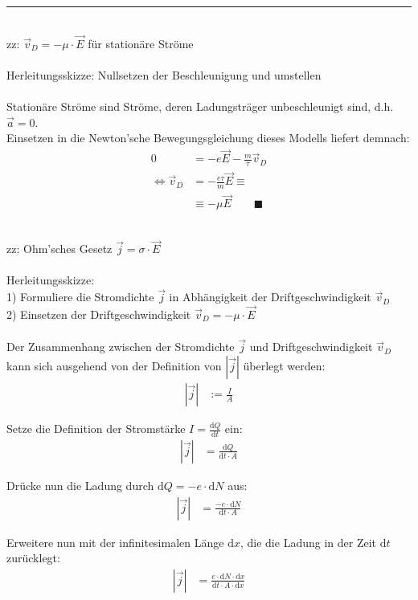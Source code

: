 \documentclass{article}
\newcommand{\diff}{\mathrm{d}}
\begin{document}
{\color{violet}
\hrule
	\\
	zz: $\vec{v}_D = -\mu \cdot \vec{E}$ für stationäre Ströme \\
	\\
	Herleitungsskizze: Nullsetzen der Beschleunigung und umstellen\\
	\\
	Stationäre Ströme sind Ströme, deren Ladungsträger unbeschleunigt sind, d.h. $\vec{a} = 0$.\\
	Einsetzen in die Newton'sche Bewegungsgleichung dieses Modells liefert demnach:
		\begin{align*}
			0 &= -e \vec{E} - \frac{m}{\tau} \vec{v}_D \\
			\Leftrightarrow \vec{v}_D &= -\frac{e\tau}{m} \vec{E} \equiv \\
			&\equiv -\mu \vec{E} \qquad \blacksquare
		\end{align*}
	

	\\
	zz: Ohm'sches Gesetz $\vec{j} = \sigma \cdot \vec{E}$\\
	\\
	Herleitungsskizze:\\
	1) Formuliere die Stromdichte $\vec{j}$ in Abhängigkeit der Driftgeschwindigkeit $\vec{v}_D$\\
	2) Einsetzen der Driftgeschwindigkeit $\vec{v}_D = -\mu \cdot \vec{E}$\\
	\\
	Der Zusammenhang zwischen der Stromdichte $\vec{j}$ und Driftgeschwindigkeit $\vec{v}_D$ kann sich ausgehend von der Definition von $|\vec{j}|$ überlegt werden:
		\begin{align*}
			|\vec{j}| &:= \frac{I}{A}
		\end{align*}

	Setze die Definition der Stromstärke $I = \frac{\diff Q}{\diff t}$ ein:
		\begin{align*}
			|\vec{j}| &= \frac{\diff Q}{\diff t \cdot A}
		\end{align*}
	
	Drücke nun die Ladung durch $\diff Q = -e \cdot \diff N$ aus:
		\begin{align*}
			|\vec{j}| &= \frac{-e \cdot \diff N}{\diff t \cdot A}
		\end{align*}
	
	Erweitere nun mit der infinitesimalen Länge $\diff x$, die die Ladung in der Zeit $\diff t$ zurücklegt:
		\begin{align*}
			|\vec{j}| &= \frac{e \cdot \diff N \cdot \diff x}{\diff t \cdot A \cdot \diff x}
		\end{align*}
	
}
\end{document}
